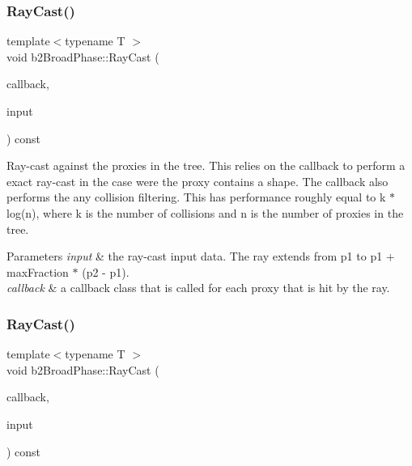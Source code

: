 \subsubsection{\texorpdfstring{Ray\+Cast()}{RayCast()}\hspace{0.1cm}{\footnotesize\ttfamily [1/2]}}
{\footnotesize\ttfamily template$<$typename T $>$ \\
void b2\+Broad\+Phase\+::\+Ray\+Cast (\begin{DoxyParamCaption}\item[{T $\ast$}]{callback,  }\item[{const \hyperlink{structb2RayCastInput}{b2\+Ray\+Cast\+Input} \&}]{input }\end{DoxyParamCaption}) const}

Ray-\/cast against the proxies in the tree. This relies on the callback to perform a exact ray-\/cast in the case were the proxy contains a shape. The callback also performs the any collision filtering. This has performance roughly equal to k $\ast$ log(n), where k is the number of collisions and n is the number of proxies in the tree. 
\begin{DoxyParams}{Parameters}
{\em input} & the ray-\/cast input data. The ray extends from p1 to p1 + max\+Fraction $\ast$ (p2 -\/ p1). \\
\hline
{\em callback} & a callback class that is called for each proxy that is hit by the ray. \\
\hline
\end{DoxyParams}
\mbox{\label{classb2BroadPhase_ae65392ea91c7d0839ed5312f78b2837a}} 
\subsubsection{\texorpdfstring{Ray\+Cast()}{RayCast()}\hspace{0.1cm}{\footnotesize\ttfamily [2/2]}}
{\footnotesize\ttfamily template$<$typename T $>$ \\
void b2\+Broad\+Phase\+::\+Ray\+Cast (\begin{DoxyParamCaption}\item[{T $\ast$}]{callback,  }\item[{const \hyperlink{structb2RayCastInput}{b2\+Ray\+Cast\+Input} \&}]{input }\end{DoxyParamCaption}) const\hspace{0.3cm}{\ttfamily [inline]}}

